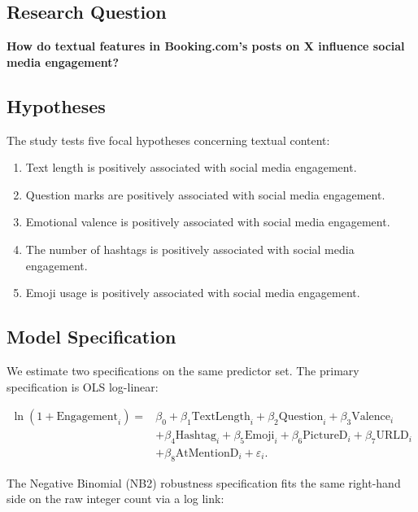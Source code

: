 \documentclass[12pt,a4paper]{article}
\begin{document}
\subsection{Research Question}
\textbf{How do textual features in Booking.com's posts on X influence social media engagement?}

\subsection{Hypotheses}

The study tests five focal hypotheses concerning textual content:

\begin{enumerate}[label=H\arabic*.]
    \item Text length is positively associated with social media engagement.
    \item Question marks are positively associated with social media engagement.
    \item Emotional valence is positively associated with social media engagement.
    \item The number of hashtags is positively associated with social media engagement.
    \item Emoji usage is positively associated with social media engagement.
\end{enumerate}

\subsection{Model Specification}

We estimate two specifications on the same predictor set. The primary specification is OLS log-linear:

\begin{equation}
\begin{aligned}
\ln(1 + \text{Engagement}_i) = {}& \beta_0 + \beta_1\text{TextLength}_i + \beta_2\text{Question}_i + \beta_3\text{Valence}_i \\
& + \beta_4\text{Hashtag}_i + \beta_5\text{Emoji}_i + \beta_6\text{PictureD}_i + \beta_7\text{URLD}_i \\
& + \beta_8\text{AtMentionD}_i + \varepsilon_i.
\end{aligned}
\end{equation}

The Negative Binomial (NB2) robustness specification fits the same right-hand side on the raw integer count via a log link:
\end{document}
